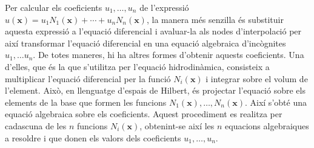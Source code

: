 \documentclass{article}
\begin{document}
Per calcular els coeficients $u_1,\ldots,u_n$ de l'expressi\'{o} $u(\boldsymbol{x})=u_1N_1(\boldsymbol{x})+\cdots+u_nN_n(\boldsymbol{x})$, la manera m\'{e}s senzilla \'{e}s substituir aquesta expressi\'{o} a l'equaci\'{o} diferencial i avaluar-la als nodes d'interpolaci\'{o} per aix\'{i} transformar l'equaci\'{o} diferencial en una equaci\'{o} algebraica d'inc\`{o}gnites $u_1,\ldots u_n$. De totes maneres, hi ha altres formes d'obtenir aquests coeficients. Una d'elles, que \'{e}s la que s'utilitza per l'equaci\'{o} hidrodin\`{a}mica, consisteix a multiplicar l'equaci\'{o} diferencial per la funci\'{o} $N_i(\boldsymbol{x})$ i integrar sobre el volum de l'element. Aix\`{o}, en llenguatge d'espais de Hilbert, \'{e}s projectar l'equaci\'{o} sobre els elements de la base que formen les funcions $N_1(\boldsymbol{x}),\ldots,N_n(\boldsymbol{x})$. Aix\'{i} s'obt\'{e} una equaci\'{o} algebraica sobre els coeficients. Aquest procediment es realitza per cadascuna de les $n$ funcions $N_i(\boldsymbol{x})$, obtenint-se aix\'{i} les $n$ equacions algebraiques a resoldre i que donen els valors dels coeficients $u_1,\ldots,u_n$.






\end{document}
